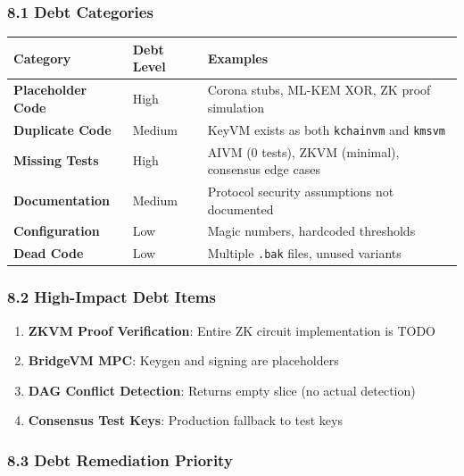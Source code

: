 \documentclass[
]{article}
\newcounter{none} %
\providecommand{\tightlist}{%
  \setlength{\itemsep}{0pt}\setlength{\parskip}{0pt}}
\begin{document}
\subsubsection{8.1 Debt Categories}\label{81-debt-categories}

{\def\LTcaptype{none} %
\begin{longtable}[]{@{}lll@{}}
\toprule\noalign{}
Category & Debt Level & Examples \\
\midrule\noalign{}
\endhead
\bottomrule\noalign{}
\endlastfoot
\textbf{Placeholder Code} & High & Corona stubs, ML-KEM XOR, ZK proof
simulation \\
\textbf{Duplicate Code} & Medium & KeyVM exists as both
\texttt{kchainvm} and \texttt{kmsvm} \\
\textbf{Missing Tests} & High & AIVM (0 tests), ZKVM (minimal),
consensus edge cases \\
\textbf{Documentation} & Medium & Protocol security assumptions not
documented \\
\textbf{Configuration} & Low & Magic numbers, hardcoded thresholds \\
\textbf{Dead Code} & Low & Multiple \texttt{.bak} files, unused
variants \\
\end{longtable}
}

\subsubsection{8.2 High-Impact Debt
Items}\label{82-high-impact-debt-items}

\begin{enumerate}
\def\labelenumi{\arabic{enumi}.}
\tightlist
\item
  \textbf{ZKVM Proof Verification}: Entire ZK circuit implementation is
  TODO
\item
  \textbf{BridgeVM MPC}: Keygen and signing are placeholders
\item
  \textbf{DAG Conflict Detection}: Returns empty slice (no actual
  detection)
\item
  \textbf{Consensus Test Keys}: Production fallback to test keys
\end{enumerate}

\subsubsection{8.3 Debt Remediation
Priority}\label{83-debt-remediation-priority}
\end{document}
